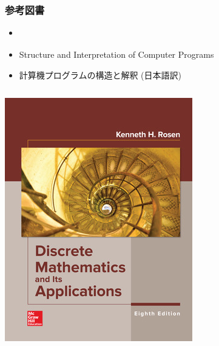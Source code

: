 \begin{frame}[shrink]
\frametitle{参考図書}
  \begin{itemize}
\item \href{https://www.mheducation.com/highered/product/discrete-mathematics-applications-rosen/M9781259676512.html}{}
\item Structure and Interpretation of Computer Programs \href{http://web.mit.edu/alexmv/6.037/sicp.pdf}{} 
\item 計算機プログラムの構造と解釈 (日本語訳)\\ \href{http://sicp.iijlab.net/fulltext/xcont.html}{} 
  \end{itemize}
  \begin{columns}[c]
    \begin{column}{0.5\textwidth}
\centering
\includegraphics[scale=1.5]{./Figure/Discrete_Mathematics_And_its_Applications.jpeg}
    \end{column}
    \begin{column}{0.45\textwidth}
\centering

\end{column}
\end{columns}
\end{frame}
